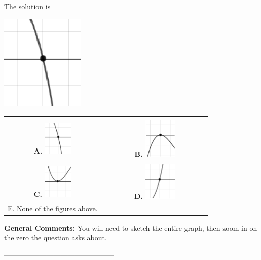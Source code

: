\documentclass{article}[14pt]
\begin{document}
 
 The solution is  
 \begin{center} \includegraphics[width=0.3\textwidth]{../Figures/zeroBehaviorNegativeOddA.png} \end{center}\begin{tabular}{|c|c|} 
\hline 
 & \tabularnewline 
 \textbf{A.} \includegraphics[width=0.3\textwidth]{../Figures/zeroBehaviorNegativeOddA.png} & \textbf{B.} \includegraphics[width=0.3\textwidth]{../Figures/zeroBehaviorNegativeEvenA.png} \tabularnewline 
\hline 
 & \tabularnewline 
 \textbf{C.} \includegraphics[width=0.3\textwidth]{../Figures/zeroBehaviorPositiveEvenA.png} & \textbf{D.} \includegraphics[width=0.3\textwidth]{../Figures/zeroBehaviorPositiveOddA.png} \tabularnewline 
\hline 
 E. None of the figures above. & \tabularnewline 
\hline 
 \end{tabular} 
 
\textbf{General Comments:} You will need to sketch the entire graph, then zoom in on the zero the question asks about.

-----------------------------------------------
\end{document}

